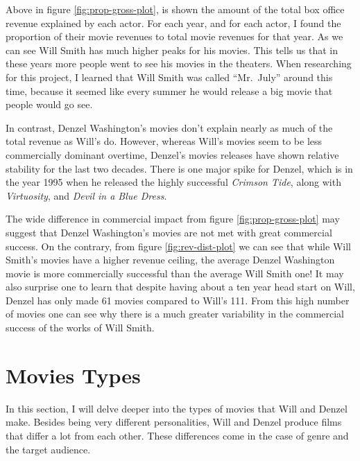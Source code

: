 \documentclass[]{article}
\begin{document}
Above in figure \ref{fig:prop-gross-plot}, is shown the amount of the
total box office revenue explained by each actor. For each year, and for
each actor, I found the proportion of their movie revenues to total
movie revenues for that year. As we can see Will Smith has much higher
peaks for his movies. This tells us that in these years more people went
to see his movies in the theaters. When researching for this project, I
learned that Will Smith was called ``Mr.~July'' around this time,
because it seemed like every summer he would release a big movie that
people would go see.

In contrast, Denzel Washington's movies don't explain nearly as much of
the total revenue as Will's do. However, whereas Will's movies seem to
be less commercially dominant overtime, Denzel's movies releases have
shown relative stability for the last two decades. There is one major
spike for Denzel, which is in the year 1995 when he released the highly
successful \emph{Crimson Tide}, along with \emph{Virtuosity}, and
\emph{Devil in a Blue Dress}.

The wide difference in commercial impact from figure
\ref{fig:prop-gross-plot} may suggest that Denzel Washington's movies
are not met with great commercial success. On the contrary, from figure
\ref{fig:rev-dist-plot} we can see that while Will Smith's movies have a
higher revenue ceiling, the average Denzel Washington movie is more
commercially successful than the average Will Smith one! It may also
surprise one to learn that despite having about a ten year head start on
Will, Denzel has only made 61 movies compared to Will's 111. From this
high number of movies one can see why there is a much greater
variability in the commercial success of the works of Will Smith.

\section{Movies Types}

In this section, I will delve deeper into the types of movies that Will
and Denzel make. Besides being very different personalities, Will and
Denzel produce films that differ a lot from each other. These
differences come in the case of genre and the target audience.
\end{document}
